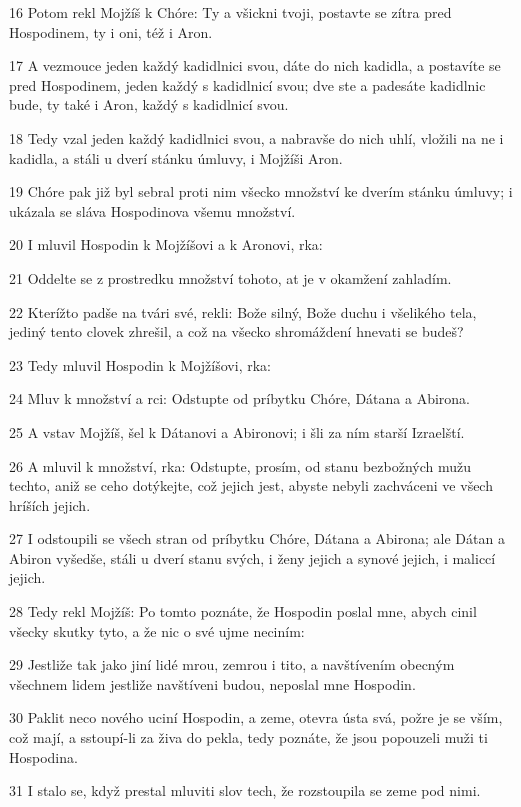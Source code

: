 \par 16 Potom rekl Mojžíš k Chóre: Ty a všickni tvoji, postavte se zítra pred Hospodinem, ty i oni, též i Aron.
\par 17 A vezmouce jeden každý kadidlnici svou, dáte do nich kadidla, a postavíte se pred Hospodinem, jeden každý s kadidlnicí svou; dve ste a padesáte kadidlnic bude, ty také i Aron, každý s kadidlnicí svou.
\par 18 Tedy vzal jeden každý kadidlnici svou, a nabravše do nich uhlí, vložili na ne i kadidla, a stáli u dverí stánku úmluvy, i Mojžíši Aron.
\par 19 Chóre pak již byl sebral proti nim všecko množství ke dverím stánku úmluvy; i ukázala se sláva Hospodinova všemu množství.
\par 20 I mluvil Hospodin k Mojžíšovi a k Aronovi, rka:
\par 21 Oddelte se z prostredku množství tohoto, at je v okamžení zahladím.
\par 22 Kterížto padše na tvári své, rekli: Bože silný, Bože duchu i všelikého tela, jediný tento clovek zhrešil, a což na všecko shromáždení hnevati se budeš?
\par 23 Tedy mluvil Hospodin k Mojžíšovi, rka:
\par 24 Mluv k množství a rci: Odstupte od príbytku Chóre, Dátana a Abirona.
\par 25 A vstav Mojžíš, šel k Dátanovi a Abironovi; i šli za ním starší Izraelští.
\par 26 A mluvil k množství, rka: Odstupte, prosím, od stanu bezbožných mužu techto, aniž se ceho dotýkejte, což jejich jest, abyste nebyli zachváceni ve všech hríších jejich.
\par 27 I odstoupili se všech stran od príbytku Chóre, Dátana a Abirona; ale Dátan a Abiron vyšedše, stáli u dverí stanu svých, i ženy jejich a synové jejich, i maliccí jejich.
\par 28 Tedy rekl Mojžíš: Po tomto poznáte, že Hospodin poslal mne, abych cinil všecky skutky tyto, a že nic o své ujme neciním:
\par 29 Jestliže tak jako jiní lidé mrou, zemrou i tito, a navštívením obecným všechnem lidem jestliže navštíveni budou, neposlal mne Hospodin.
\par 30 Paklit neco nového uciní Hospodin, a zeme, otevra ústa svá, požre je se vším, což mají, a sstoupí-li za živa do pekla, tedy poznáte, že jsou popouzeli muži ti Hospodina.
\par 31 I stalo se, když prestal mluviti slov tech, že rozstoupila se zeme pod nimi.
